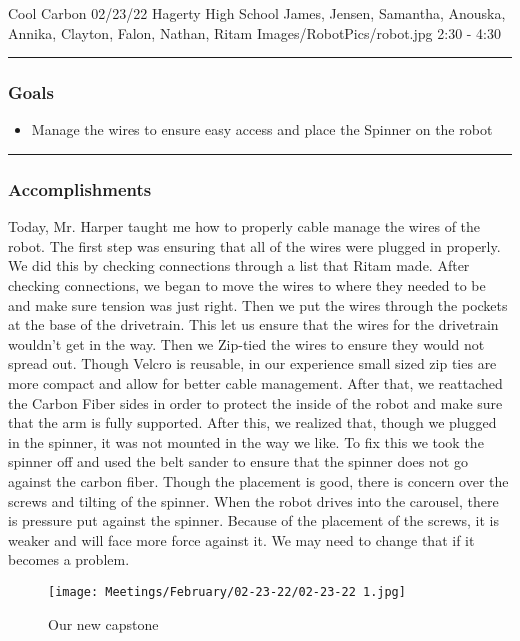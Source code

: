 \insertmeeting 
	{Cool Carbon} 
	{02/23/22} 
	{Hagerty High School}
	{James, Jensen, Samantha, Anouska, Annika, Clayton, Falon, Nathan, Ritam}
	{Images/RobotPics/robot.jpg}
	{2:30 - 4:30}
	
\noindent\hfil\rule{\textwidth}{.4pt}\hfil
\subsubsection*{Goals}
\begin{itemize}
    \item Manage the wires to ensure easy access and place the Spinner on the robot

\end{itemize} 

\noindent\hfil\rule{\textwidth}{.4pt}\hfil

\subsubsection*{Accomplishments}
Today, Mr. Harper taught me how to properly cable manage the wires of the robot. The first step was ensuring that all of the wires were plugged in properly. We did this by checking connections through a list that Ritam made. After checking connections, we began to move the wires to where they needed to be and make sure tension was just right. Then we put the wires through the pockets at the base of the drivetrain. This let us ensure that the wires for the drivetrain wouldn't get in the way. Then we Zip-tied the wires to ensure they would not spread out. Though Velcro is reusable, in our experience small sized zip ties are more compact and allow for better cable management. After that, we reattached the Carbon Fiber sides in order to protect the inside of the robot and make sure that the arm is fully supported. After this, we realized that, though we plugged in the spinner, it was not mounted in the way we like. To fix this we took the spinner off and used the belt sander to ensure that the spinner does not go against the carbon fiber. Though the placement is good, there is concern over the screws and tilting of the spinner. When the robot drives into the carousel, there is pressure put against the spinner. Because of the placement of the screws, it is weaker and will face more force against it. We may need to change that if it becomes a problem.

\begin{figure}[htp]
\centering
\texttt{[image: Meetings/February/02-23-22/02-23-22 1.jpg]}
\caption{Our new capstone}
\label{fig:022322_1}
\end{figure}



